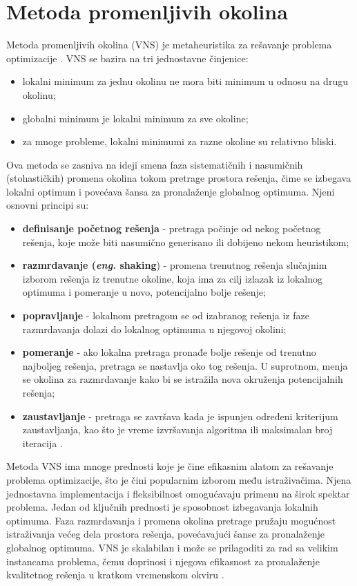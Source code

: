 \documentclass[12pt,oneside]{memoir}
\begin{document}
\section{Metoda promenljivih okolina}
Metoda promenljivih okolina (VNS) je metaheuristika za rešavanje problema optimizacije \cite{mladenovic1997}. 
VNS se bazira na tri jednostavne činjenice:
\begin{itemize}
    \item lokalni minimum za jednu okolinu ne mora biti minimum u odnosu na drugu okolinu;
    \item globalni minimum je lokalni minimum za sve okoline;
    \item za mnoge probleme, lokalni minimumi za razne okoline su relativno bliski.
\end{itemize}

Ova metoda se zasniva na ideji smena faza sistematičnih i nasumičnih (stohastičkih) promena okolina tokom pretrage prostora rešenja, čime se izbegava lokalni optimum i povećava šansa za pronalaženje globalnog optimuma. Njeni osnovni principi su:
\begin{itemize}
    \item \textbf{definisanje početnog rešenja} - pretraga počinje od nekog početnog rešenja, koje može biti nasumično generisano ili dobijeno nekom heuristikom;
    \item \textbf{razmrdavanje (\textit{eng.} shaking}) - promena trenutnog rešenja slučajnim izborom rešenja iz trenutne okoline, koja ima za cilj izlazak iz lokalnog optimuma i pomeranje u novo, potencijalno bolje rešenje;
    \item \textbf{popravljanje} - lokalnom pretragom se od izabranog rešenja iz faze razmrdavanja dolazi do lokalnog optimuma u njegovoj okolini;
    \item \textbf{pomeranje} - ako lokalna pretraga pronađe bolje rešenje od trenutno najboljeg rešenja, pretraga se nastavlja oko tog rešenja. U suprotnom, menja se okolina za razmrdavanje kako bi se istražila nova okruženja potencijalnih rešenja;
    \item \textbf{zaustavljanje} - pretraga se završava kada je ispunjen određeni kriterijum zaustavljanja, kao što je vreme izvršavanja algoritma ili maksimalan broj iteracija \cite{mladenovic2009}.
\end{itemize}

Metoda VNS ima mnoge prednosti koje je čine efikasnim alatom za rešavanje problema optimizacije, što je čini popularnim izborom među istraživačima. Njena jednostavna implementacija i fleksibilnost omogućavaju primenu na širok spektar problema. Jedan od ključnih prednosti je sposobnost izbegavanja lokalnih optimuma. Faza razmrdavanja i promena okolina pretrage pružaju mogućnost istraživanja većeg dela prostora rešenja, povećavajući šanse za pronalaženje globalnog optimuma. VNS je skalabilan i može se prilagoditi za rad sa velikim instancama problema, čemu doprinosi i njegova efikasnost za pronalaženje kvalitetnog rešenja u kratkom vremenskom okviru \cite{mladenovic2010}.\\
\end{document}
